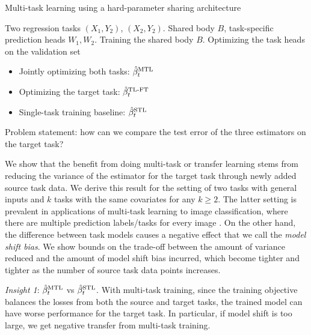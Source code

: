\begin{algorithm}[!t]
	\caption{Multi-task learning using a hard-parameter sharing architecture}
	\label{alg_estimator}
	\begin{algorithmic}[1]
		\Input Two regression tasks $(X_1, Y_2)$, $(X_2, Y_2)$.
		\Param Shared body $B$, task-specific prediction heads $W_1, W_2$.
		\State Training the shared body $B$.
		\State Optimizing the task heads on the validation set

		\begin{itemize}
			\item Jointly optimizing both tasks: $\hat{\beta}_t^{\text{MTL}}$
			\item Optimizing the target task: $\hat{\beta}_t^{\text{TL-FT}}$
			\item Single-task training baseline: $\hat{\beta}_t^{\text{STL}}$
		\end{itemize}
		\State Problem statement: how can we compare the test error of the three estimators on the target task?
	\end{algorithmic}
\end{algorithm}

\smallskip
{}
	We show that the benefit from doing multi-task or transfer learning stems from reducing the variance of the estimator for the target task through newly added source task data.
	We derive this result for the setting of two tasks with general inputs and $k$ tasks with the same covariates for any $k \ge 2$.
	The latter setting is prevalent in applications of multi-task learning to image classification, where there are multiple prediction labels/tasks for every image \cite{EA20}.
	On the other hand, the difference between task models causes a negative effect that we call the \textit{model shift bias}.
	We show bounds on the trade-off between the amount of variance reduced and the amount of model shift bias incurred, which become tighter and tighter as the number of source task data points increases.

	{\it Insight 1}: $\hat{\beta}_t^{\text{MTL}}$ vs $\hat{\beta}_t^{\text{STL}}$.
	With multi-task training, since the training objective balances the losses from both the source and target tasks, the trained model can have worse performance for the target task.
	In particular, if model shift is too large, we get negative transfer from multi-task training.


